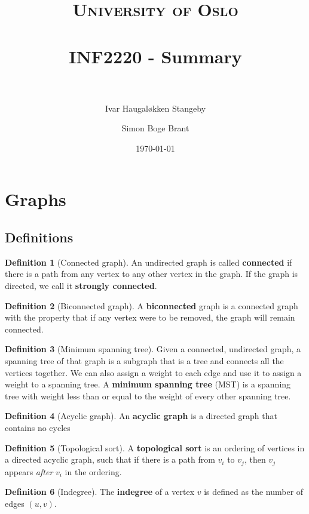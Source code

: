 \documentclass[paper=a4, fontsize=11pt]{scrartcl}
\title{ 
  \normalfont \normalsize
  \textsc{University of Oslo} \\ [25pt] %
  \horrule{0.5pt} \\[0.4cm] %
  \huge INF2220 - Summary \\ %
  \horrule{2pt} \\[0.5cm] %
}
\author{Ivar Haugaløkken Stangeby \and Simon Boge Brant} %
\date{\normalsize\today} %
\numberwithin{equation}{section} %
\numberwithin{figure}{section} %
\numberwithin{table}{section} %
\theoremstyle{definition}
\newtheorem*{definition}{Definition}
\begin{document}
\maketitle %
\tableofcontents
\section{Graphs}

\subsection{Definitions}
\begin{definition}[Connected graph]
  An undirected graph is called \textbf{connected} if there is a path from any vertex to any other vertex in the graph. If the graph is directed, we call it \textbf{strongly connected}.
\end{definition}
\begin{definition}[Biconnected graph]
  A \textbf{biconnected} graph is a connected graph with the property that if any vertex were to be removed, the graph will remain connected.   
\end{definition}

\begin{definition}[Minimum spanning tree]
  Given a connected, undirected graph, a spanning tree of that graph is a subgraph that is a tree and connects all the vertices together. We can also assign a weight to each edge and use it to assign a weight to a spanning tree. A \textbf{minimum spanning tree} (MST) is a spanning tree with weight less than or equal to the weight of every other spanning tree.
\end{definition}

\begin{definition}[Acyclic graph]
  An \textbf{acyclic graph} is a directed graph that contains no cycles
\end{definition}

\begin{definition}[Topological sort] 
  A \textbf{topological sort} is an ordering of 
  vertices in a directed acyclic
  graph, such that if there is a path from \(v_i\) to \(v_j\),
  then \(v_j\) appears \textit{after} \(v_i\) in the ordering.  
\end{definition}

\begin{definition}[Indegree]
  The \textbf{indegree} of a vertex \(v\) is defined as the number of edges \(\left(u,v\right)\).
\end{definition}
\end{document}
